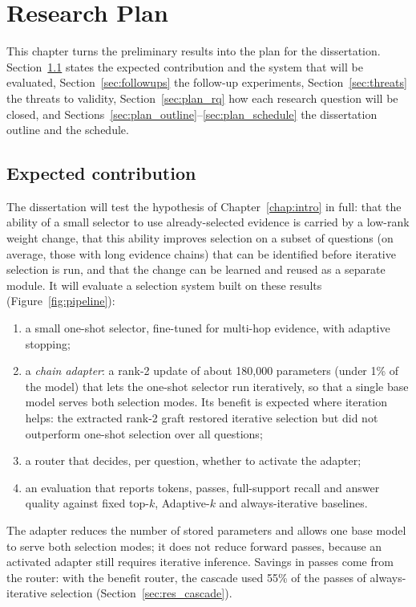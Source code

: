 \chapter{Research Plan}
\label{chap:plan}

This chapter turns the preliminary results into the plan for the dissertation. Section~\ref{sec:plan_contrib} states the expected contribution and the system that will be evaluated, Section~\ref{sec:followups} the follow-up experiments, Section~\ref{sec:threats} the threats to validity, Section~\ref{sec:plan_rq} how each research question will be closed, and Sections~\ref{sec:plan_outline}--\ref{sec:plan_schedule} the dissertation outline and the schedule.

\section{Expected contribution}
\label{sec:plan_contrib}

The dissertation will test the hypothesis of Chapter~\ref{chap:intro} in full: that the ability of a small selector to use already-selected evidence is carried by a low-rank weight change, that this ability improves selection on a subset of questions (on average, those with long evidence chains) that can be identified before iterative selection is run, and that the change can be learned and reused as a separate module. It will evaluate a selection system built on these results (Figure~\ref{fig:pipeline}):
\begin{enumerate}
  \item a small one-shot selector, fine-tuned for multi-hop evidence, with adaptive stopping;
  \item a \emph{chain adapter}: a rank-2 update of about 180,000 parameters (under 1\% of the model) that lets the one-shot selector run iteratively, so that a single base model serves both selection modes. Its benefit is expected where iteration helps: the extracted rank-2 graft restored iterative selection but did not outperform one-shot selection over all questions;
  \item a router that decides, per question, whether to activate the adapter;
  \item an evaluation that reports tokens, passes, full-support recall and answer quality against fixed top-$k$, Adaptive-$k$ and always-iterative baselines.
\end{enumerate}
The adapter reduces the number of stored parameters and allows one base model to serve both selection modes; it does not reduce forward passes, because an activated adapter still requires iterative inference. Savings in passes come from the router: with the benefit router, the cascade used 55\% of the passes of always-iterative selection (Section~\ref{sec:res_cascade}).

